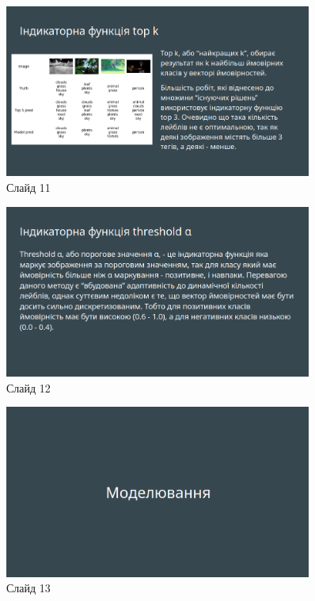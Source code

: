 \documentclass{udstu}
\begin{document}
\begin{figure}[!ht]
	\centering
	\includegraphics[width=0.9\textwidth]{PNG/present/present-11}
	\caption{Слайд 11}
\end{figure}

\begin{figure}[!ht]
	\centering
	\includegraphics[width=0.9\textwidth]{PNG/present/present-12}
	\caption{Слайд 12}
\end{figure}

\begin{figure}[!ht]
	\centering
	\includegraphics[width=0.9\textwidth]{PNG/present/present-13}
	\caption{Слайд 13}
\end{figure}
\end{document}
